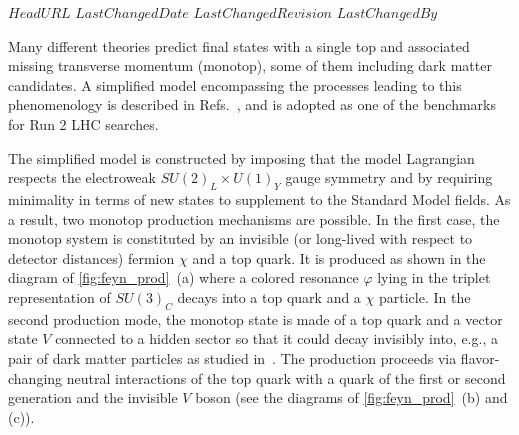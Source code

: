 \svnidlong
{$HeadURL$}
{$LastChangedDate$}
{$LastChangedRevision$}
{$LastChangedBy$}

Many different theories predict final states with a single top and associated missing 
transverse momentum (monotop), some of them including dark matter candidates. 
A simplified model encompassing the processes leading to this phenomenology is described in Refs.~\cite{AndreaFuksMaltoni,Agram:2013wda,Boucheneb:2014wza},
and is adopted as one of the benchmarks for Run 2 LHC searches. 

The simplified model is constructed by imposing that the model Lagrangian
respects the electroweak $SU(2)_L \times U(1)_Y$ gauge symmetry and by
requiring minimality in terms of new states to supplement to the Standard
Model fields. As a result, two monotop production mechanisms are possible.
In the first case, the monotop system is constituted by an invisible (or
long-lived with respect to detector distances) fermion $\chi$ and a top quark.
It is produced as shown in the diagram of \ref{fig:feyn_prod}~(a) where a colored
resonance $\varphi$ lying in the triplet representation of $SU(3)_C$ decays
into a top quark and a $\chi$ particle. In the second production mode, the
monotop state is made of a top quark and a vector state $V$ connected to a
hidden sector so that it could decay invisibly into, e.g., a pair of dark
matter particles as studied in~\cite{Boucheneb:2014wza}. The production proceeds via
flavor-changing neutral interactions of the top quark with a quark of the
first or second generation and the invisible $V$ boson (see the diagrams of
\ref{fig:feyn_prod}~(b) and (c)).


